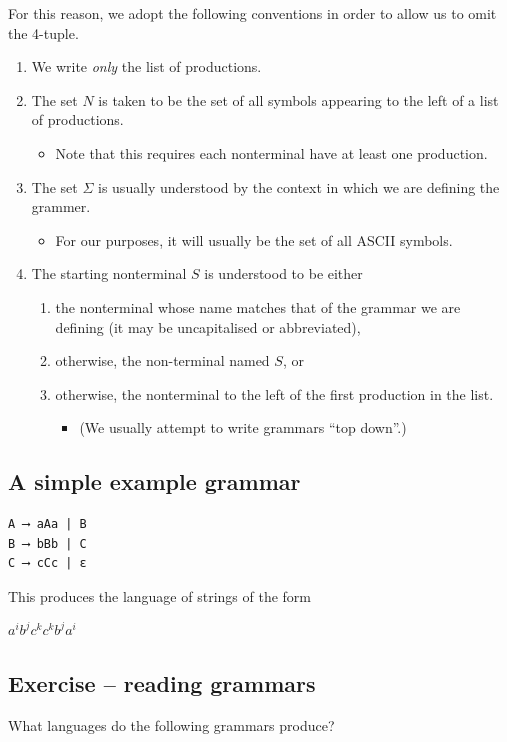 \documentclass[11pt]{article}
\theoremstyle{definition}
\begin{document}
For this reason, we adopt the following conventions
in order to allow us to omit the 4-tuple.
\begin{enumerate}
\item We write \emph{only} the list of productions.
\item The set \(N\) is taken to be the set of all symbols
appearing to the left of a list of productions.
\begin{itemize}
\item Note that this requires each nonterminal have
at least one production.
\end{itemize}
\item The set \(Σ\) is usually understood by the context
in which we are defining the grammer.
\begin{itemize}
\item For our purposes, it will usually be the set of
all ASCII symbols.
\end{itemize}
\item The starting nonterminal \(S\) is understood to be either
\begin{enumerate}
\item the nonterminal whose name matches that of the grammar
we are defining (it may be uncapitalised or abbreviated),
\item otherwise, the non-terminal named \(S\), or
\item otherwise, the nonterminal to the left of
the first production in the list.
\begin{itemize}
\item (We usually attempt to write grammars “top down”.)
\end{itemize}
\end{enumerate}
\end{enumerate}

\subsection{A simple example grammar}
\label{sec:org7130b52}
\begin{verbatim}
A ⟶ aAa | B
B ⟶ bBb | C
C ⟶ cCc | ε
\end{verbatim}

This produces the language of strings of
the form
\begin{center}
\(a^{i}b^{j}c^{k}c^{k}b^{j}a^{i}\)
\end{center}

\subsection{Exercise – reading grammars}
\label{sec:org68b8033}
What languages do the following grammars produce?
\end{document}
